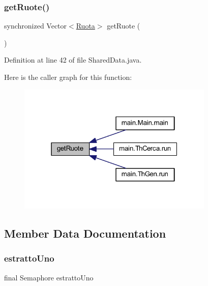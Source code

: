 \subsubsection{\texorpdfstring{get\+Ruote()}{getRuote()}}
{\footnotesize\ttfamily synchronized Vector$<$\mbox{\hyperlink{classmain_1_1_ruota}{Ruota}}$>$ get\+Ruote (\begin{DoxyParamCaption}{ }\end{DoxyParamCaption})}



Definition at line 42 of file Shared\+Data.\+java.

Here is the caller graph for this function\+:
\nopagebreak
\begin{figure}[H]
\begin{center}
\leavevmode
\includegraphics[width=265pt]{classmain_1_1_shared_data_aa492c5b4f3fb55eb33f9c79b7b484d41_icgraph}
\end{center}
\end{figure}


\subsection{Member Data Documentation}
\mbox{\label{classmain_1_1_shared_data_a63712f23e96673948c3fd3c48b64d05b}} 
\subsubsection{\texorpdfstring{estratto\+Uno}{estrattoUno}}
{\footnotesize\ttfamily final Semaphore estratto\+Uno\hspace{0.3cm}{\ttfamily [private]}}



